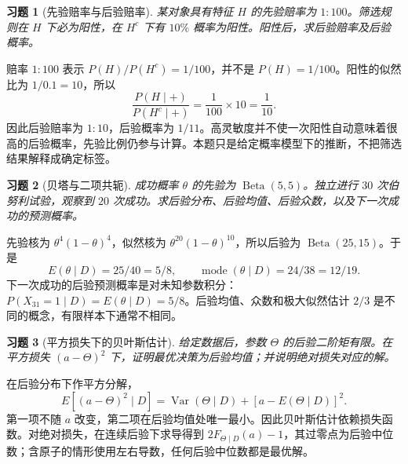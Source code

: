 \documentclass[12pt,fontset=fandol]{ctexart}
\newtheorem{exercise}{习题}[section]
\begin{document}
\begin{exercise}[先验赔率与后验赔率]\label{q:M-E2-II3}
某对象具有特征 $H$ 的先验赔率为 $1:100$。筛选规则在 $H$ 下必为阳性，在 $H^c$ 下有 $10\%$ 概率为阳性。阳性后，求后验赔率及后验概率。\par{}
\end{exercise}

\begin{solve}\label{a:M-E2-II3}赔率 $1:100$ 表示 $P(H)/P(H^c)=1/100$，并不是 $P(H)=1/100$。阳性的似然比为 $1/0.1=10$，所以\[\frac{P(H\mid+)}{P(H^c\mid+)}=\frac1{100}\times10=\frac1{10}.\]因此后验赔率为 $1:10$，后验概率为 $1/11$。高灵敏度并不使一次阳性自动意味着很高的后验概率，先验比例仍参与计算。本题只是给定概率模型下的推断，不把筛选结果解释成确定标签。\end{solve}

\begin{exercise}[贝塔与二项共轭]\label{q:M-F-C14}
成功概率 $\theta$ 的先验为 $\operatorname{Beta}(5,5)$。独立进行 $30$ 次伯努利试验，观察到 $20$ 次成功。求后验分布、后验均值、后验众数，以及下一次成功的预测概率。\par{}
\end{exercise}

\begin{solve}\label{a:M-F-C14}先验核为 $\theta^4(1-\theta)^4$，似然核为 $\theta^{20}(1-\theta)^{10}$，所以后验为 $\operatorname{Beta}(25,15)$。于是\[E(\theta\mid D)=25/40=5/8,\qquad\operatorname{mode}(\theta\mid D)=24/38=12/19.\]下一次成功的后验预测概率是对未知参数积分：$P(X_{31}=1\mid D)=E(\theta\mid D)=5/8$。后验均值、众数和极大似然估计 $2/3$ 是不同的概念，有限样本下通常不相同。\end{solve}

\begin{exercise}[平方损失下的贝叶斯估计]\label{q:B12.1}
给定数据后，参数 $\Theta$ 的后验二阶矩有限。在平方损失 $(a-\Theta)^2$ 下，证明最优决策为后验均值；并说明绝对损失对应的解。\par{}
\end{exercise}

\begin{solve}\label{a:B12.1}在后验分布下作平方分解，\[E[(a-\Theta)^2\mid D]=\operatorname{Var}(\Theta\mid D)+[a-E(\Theta\mid D)]^2.\]第一项不随 $a$ 改变，第二项在后验均值处唯一最小。因此贝叶斯估计依赖损失函数。对绝对损失，在连续后验下求导得到 $2F_{\Theta\mid D}(a)-1$，其过零点为后验中位数；含原子的情形使用左右导数，任何后验中位数都是最优解。\end{solve}
\end{document}
